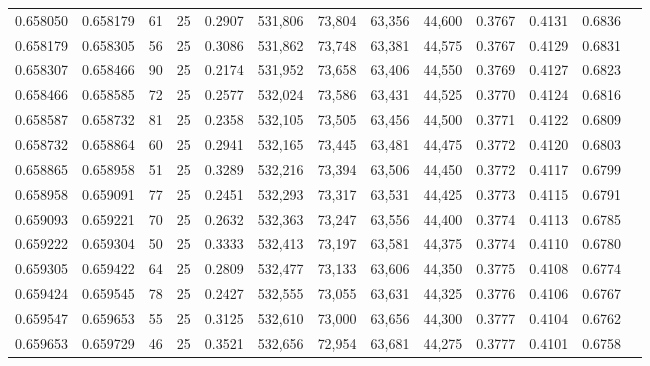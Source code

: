 \begin{tabular}{rrrrrrrrrrrrr}
0.658050 & 0.658179 &    61 &  25 &                                     0.2907 & 531,806 &  73,804 &  63,356 &  44,600 & 0.3767 & 0.4131 & 0.6836 \\
0.658179 & 0.658305 &    56 &  25 &                                     0.3086 & 531,862 &  73,748 &  63,381 &  44,575 & 0.3767 & 0.4129 & 0.6831 \\
0.658307 & 0.658466 &    90 &  25 &                                     0.2174 & 531,952 &  73,658 &  63,406 &  44,550 & 0.3769 & 0.4127 & 0.6823 \\
0.658466 & 0.658585 &    72 &  25 &                                     0.2577 & 532,024 &  73,586 &  63,431 &  44,525 & 0.3770 & 0.4124 & 0.6816 \\
0.658587 & 0.658732 &    81 &  25 &                                     0.2358 & 532,105 &  73,505 &  63,456 &  44,500 & 0.3771 & 0.4122 & 0.6809 \\
0.658732 & 0.658864 &    60 &  25 &                                     0.2941 & 532,165 &  73,445 &  63,481 &  44,475 & 0.3772 & 0.4120 & 0.6803 \\
0.658865 & 0.658958 &    51 &  25 &                                     0.3289 & 532,216 &  73,394 &  63,506 &  44,450 & 0.3772 & 0.4117 & 0.6799 \\
0.658958 & 0.659091 &    77 &  25 &                                     0.2451 & 532,293 &  73,317 &  63,531 &  44,425 & 0.3773 & 0.4115 & 0.6791 \\
0.659093 & 0.659221 &    70 &  25 &                                     0.2632 & 532,363 &  73,247 &  63,556 &  44,400 & 0.3774 & 0.4113 & 0.6785 \\
0.659222 & 0.659304 &    50 &  25 &                                     0.3333 & 532,413 &  73,197 &  63,581 &  44,375 & 0.3774 & 0.4110 & 0.6780 \\
0.659305 & 0.659422 &    64 &  25 &                                     0.2809 & 532,477 &  73,133 &  63,606 &  44,350 & 0.3775 & 0.4108 & 0.6774 \\
0.659424 & 0.659545 &    78 &  25 &                                     0.2427 & 532,555 &  73,055 &  63,631 &  44,325 & 0.3776 & 0.4106 & 0.6767 \\
0.659547 & 0.659653 &    55 &  25 &                                     0.3125 & 532,610 &  73,000 &  63,656 &  44,300 & 0.3777 & 0.4104 & 0.6762 \\
0.659653 & 0.659729 &    46 &  25 &                                     0.3521 & 532,656 &  72,954 &  63,681 &  44,275 & 0.3777 & 0.4101 & 0.6758 \\

\end{tabular}
